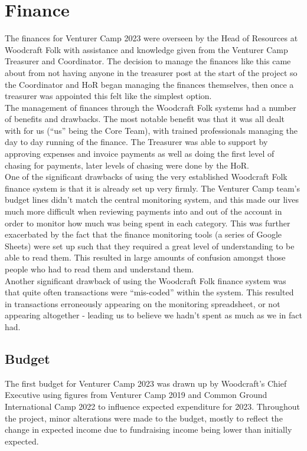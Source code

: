 \chapter{Finance}
The finances for Venturer Camp 2023 were overseen by the Head of Resources at Woodcraft Folk with assistance and knowledge given from the Venturer Camp Treasurer and Coordinator. The decision to manage the finances like this came about from not having anyone in the treasurer post at the start of the project so the Coordinator and HoR began managing the finances themselves, then once a treasurer was appointed this felt like the simplest option. \\

The management of finances through the Woodcraft Folk systems had a number of benefits and drawbacks. The most notable benefit was that it was all dealt with for us (``us'' being the Core Team), with trained professionals managing the day to day running of the finance. The Treasurer was able to support by approving expenses and invoice payments as well as doing the first level of chasing for payments, later levels of chasing were done by the HoR.\\

One of the significant drawbacks of using the very established Woodcraft Folk finance system is that it is already set up very firmly. The Venturer Camp team's budget lines didn't match the central monitoring system, and this made our lives much more difficult when reviewing payments into and out of the account in order to monitor how much was being spent in each category. This was further exacerbated by the fact that the finance monitoring tools (a series of Google Sheets) were set up such that they required a great level of understanding to be able to read them. This resulted in large amounts of confusion amongst those people who had to read them and understand them. \\

Another significant drawback of using the Woodcraft Folk finance system was that quite often transactions were ``mis-coded'' within the system. This resulted in transactions erroneously appearing on the monitoring spreadsheet, or not appearing altogether - leading us to believe we hadn't spent as much as we in fact had. 

\section{Budget}
The first budget for Venturer Camp 2023 was drawn up by Woodcraft's Chief Executive using figures from Venturer Camp 2019 and Common Ground International Camp 2022 to influence expected expenditure for 2023. Throughout the project, minor alterations were made to the budget, mostly to reflect the change in expected income due to fundraising income being lower than initially expected.\\

